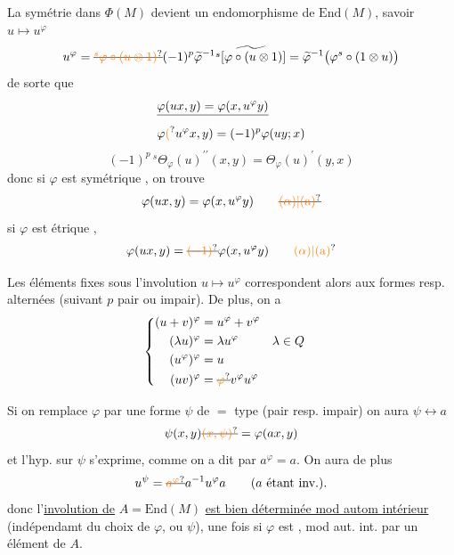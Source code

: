 La symétrie  dans $\Phi(M)$ devient un
endomorphisme de $\mathrm{End}(M)$,  savoir $u\mapsto u^\varphi$
\[
u^\varphi=\deleted{\unsure{{}^s\varphi\circ(u\otimes1)}}(-1)^p\widetilde\varphi^{-1}\widetilde{{}^s[\varphi\circ(u\otimes1)]}=\widetilde\varphi^{-1}\bigl(\varphi^s\circ(1\otimes u)\bigr)
\]
de sorte que
\[
\begin{aligned}
&\deleted{\varphi(ux,y)=\varphi(x,u^\varphi y)}\\
&\varphi\unsure{(}u^\varphi x,y)=(-1)^p\varphi(uy;x)
\end{aligned}
\]
\[
(-1)^p\,{}^s\Theta_\varphi(u)^{\prime\prime}(x,y)=\Theta_\varphi(u)^{\prime}(y,x)
\]
donc si $\varphi$ est symétrique , on trouve
\[
\varphi(ux,y)=\varphi(x,u^\varphi y)\tag*{\deleted{\unsure{($\alpha$)|(a)}}}
\]
si $\varphi$ est  étrique  , 
\[
\varphi(ux,y)=\deleted{\unsure{(-1)}}\varphi(x,u^\varphi y)\tag*{\unsure{($\alpha$)|(a)}}
\]


Les éléments fixes sous l'involution $u\mapsto u^\varphi$ correspondent
alors aux formes  resp. alternées
(suivant $p$ pair ou impair). De plus, on a
\[
\left\{\begin{aligned}
(u+v)^\varphi&=u^\varphi+v^\varphi\\
(\lambda u)^\varphi&=\lambda u^\varphi && \lambda\in Q\\
(u^\varphi)^\varphi&=u\\
(uv)^\varphi&=\deleted{\unsure{\varphi}}v^\varphi u^\varphi
\end{aligned}\right.
\]

Si on remplace $\varphi$ par une forme $\psi$ de $=$
type (pair resp. impair) on aura $\psi\longleftrightarrow a$
\[
\psi(x,y)\deleted{\unsure{(x,\psi)}}=\varphi(ax,y)
\]
et l'hyp. sur $\psi$ s'exprime, comme on a dit
par $a^\varphi=a$. On aura de plus
\[
u^\psi=\deleted{\unsure{a^\varphi}}a^{-1}u^\varphi a\qquad\text{($a$ étant inv.).}
\]
donc l'\uline{involution de} $A=\mathrm{End}(M)$ \uline{est
bien déterminée mod autom intérieur}
(indépendamt du choix de $\varphi$, ou $\psi$), une
fois si $\varphi$ est , mod aut. int.
par un élément   de $A$.

